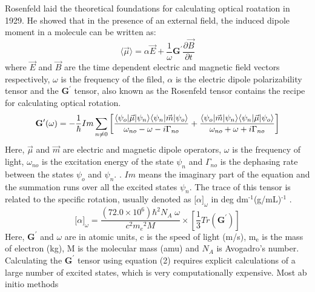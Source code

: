 Rosenfeld laid the theoretical foundations for calculating optical
roatation in 1929\cite{Rosenfeld29}. He showed that in the presence of an
external field, the induced dipole moment in a molecule can be written as:
\begin{equation}\langle\vec{\mu}\rangle = \alpha\vec{E} + \frac{1}{\omega}\textbf{G}^\prime\frac{\partial\vec{B}}{\partial t}
\end{equation} where $\vec{E} $ and $\vec{B}$ are the time dependent electric and
magnetic field vectors respectively, $\omega$ is the frequency of the filed, $\alpha$ is the electric dipole
polarizability tensor and the $\textbf{G}^\prime$ tensor, also known as the Rosenfeld
tensor contains the recipe for calculating optical rotation.
\begin{equation}
\textbf{G}^{\prime}(\omega) = -\frac{1}{\hbar} Im\sum_{n \neq 0}\left[\frac{\langle \psi_o |\vec{\mu}| \psi_n \rangle\langle \psi_n |\vec{m}| \psi_o \rangle}{\omega_{no} - \omega - i\Gamma_{no}} + \frac{\langle \psi_o |\vec{m}| \psi_n \rangle\langle \psi_n |\vec{\mu}| \psi_o \rangle}{\omega_{no} + \omega + i\Gamma_{no}} \right]
\end{equation}
Here, $\vec{\mu}$ and $\vec{m}$ are electric and magnetic dipole operators,
 $\omega$ is the frequency of light, $\omega_{no}$ is the excitation energy of
the state $\psi_n$ and $\Gamma_{no}$ is the dephasing rate between the states
$\psi_o$ and $\psi_n$.
\cite{CrawfordTamJPA07}. $Im$ means the imaginary part of the equation and the
summation runs over all the excited states $\psi_n$. The trace of this tensor
is related to the specific rotation, usually denoted as
${\lbrack\alpha\rbrack}_\omega$ in
deg dm$^{\text{-1}}$(g/mL)$^{\text{-1}}$
\cite{Crawford06}.
\begin{equation}
{\lbrack\alpha\rbrack}_{\omega} = \frac{(72.0 \times 10^6){\hbar}^2 N_A\;\omega}{c^2{m_e}^2 M} \times \left[ \frac{1}{3}Tr(\textbf{G}^\prime)\right]
\end{equation}
Here, $\textbf{G}^\prime$ and $\omega$ are in atomic units, c is the speed of light (m/s), m$_{\text{e}}$ is the mass of
electron (kg), M is the molecular mass (amu) and $N_A$ is Avogadro's
number. Calculating the $\textbf{G}^\prime$ tensor using equation (2) requires explicit calculations of a large
number of excited states, which is very computationally expensive. Most ab initio methods

